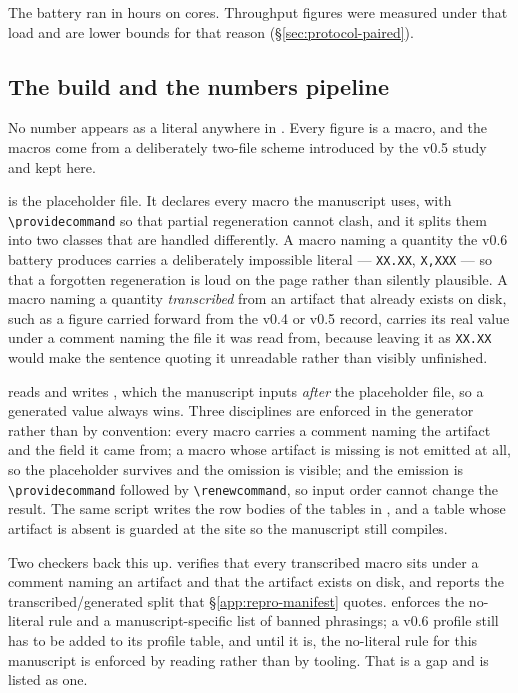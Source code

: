 The battery ran in \vsixWallClock{} hours on \vsixCores{} cores. Throughput
figures were measured under that load and are lower bounds for that reason
(\S\ref{sec:protocol-paired}).

\subsection{The build and the numbers pipeline}
\label{app:repro-build}

No number appears as a literal anywhere in . Every
figure is a macro, and the macros come from a deliberately two-file scheme
introduced by the v0.5 study and kept here.

 is the placeholder file. It declares every macro
the manuscript uses, with \verb|\providecommand| so that partial regeneration
cannot clash, and it splits them into two classes that are handled differently.
A macro naming a quantity the v0.6 battery produces carries a deliberately
impossible literal --- \texttt{XX.XX}, \texttt{X,XXX} --- so that a forgotten
regeneration is loud on the page rather than silently plausible. A macro naming a
quantity \emph{transcribed} from an artifact that already exists on disk, such as
a figure carried forward from the v0.4 or v0.5 record, carries its real value
under a comment naming the file it was read from, because leaving it as
\texttt{XX.XX} would make the sentence quoting it unreadable rather than visibly
unfinished.

 reads
 and writes
, which the manuscript inputs
\emph{after} the placeholder file, so a generated value always wins. Three
disciplines are enforced in the generator rather than by convention: every macro
carries a comment naming the artifact and the field it came from; a macro whose
artifact is missing is not emitted at all, so the placeholder survives and the
omission is visible; and the emission is \verb|\providecommand| followed by
\verb|\renewcommand|, so input order cannot change the result. The same script
writes the row bodies of the tables in , and a table
whose artifact is absent is guarded at the \verb|| site so the manuscript
still compiles.

Two checkers back this up.  verifies that
every transcribed macro sits under a comment naming an artifact and that the
artifact exists on disk, and reports the transcribed/generated split that
\S\ref{app:repro-manifest} quotes.  enforces the
no-literal rule and a manuscript-specific list of banned phrasings; a v0.6
profile still has to be added to its profile table, and until it is, the
no-literal rule for this manuscript is enforced by reading rather than by
tooling. That is a gap and is listed as one.

